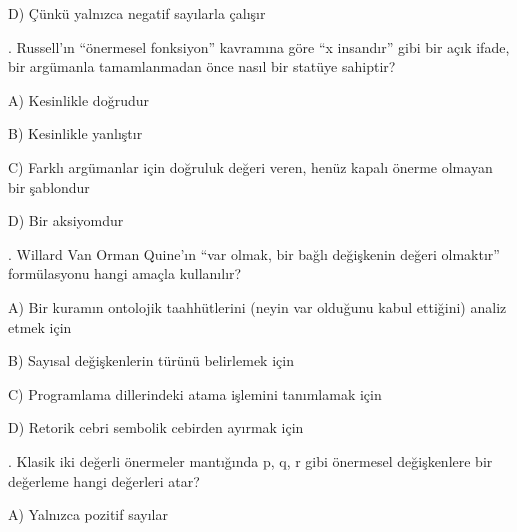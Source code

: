 \par\noindent\hspace*{1.6em}D) Çünkü yalnızca negatif sayılarla çalışır

\par\smallskip{}. Russell’ın “önermesel fonksiyon” kavramına göre “x insandır” gibi bir açık ifade, bir argümanla tamamlanmadan önce nasıl bir statüye sahiptir?

\par\noindent\hspace*{1.6em}A) Kesinlikle doğrudur

\par\noindent\hspace*{1.6em}B) Kesinlikle yanlıştır

\par\noindent\hspace*{1.6em}C) Farklı argümanlar için doğruluk değeri veren, henüz kapalı önerme olmayan bir şablondur

\par\noindent\hspace*{1.6em}D) Bir aksiyomdur

\par\smallskip{}. Willard Van Orman Quine’ın “var olmak, bir bağlı değişkenin değeri olmaktır” formülasyonu hangi amaçla kullanılır?

\par\noindent\hspace*{1.6em}A) Bir kuramın ontolojik taahhütlerini (neyin var olduğunu kabul ettiğini) analiz etmek için

\par\noindent\hspace*{1.6em}B) Sayısal değişkenlerin türünü belirlemek için

\par\noindent\hspace*{1.6em}C) Programlama dillerindeki atama işlemini tanımlamak için

\par\noindent\hspace*{1.6em}D) Retorik cebri sembolik cebirden ayırmak için

\par\smallskip{}. Klasik iki değerli önermeler mantığında p, q, r gibi önermesel değişkenlere bir değerleme hangi değerleri atar?

\par\noindent\hspace*{1.6em}A) Yalnızca pozitif sayılar

